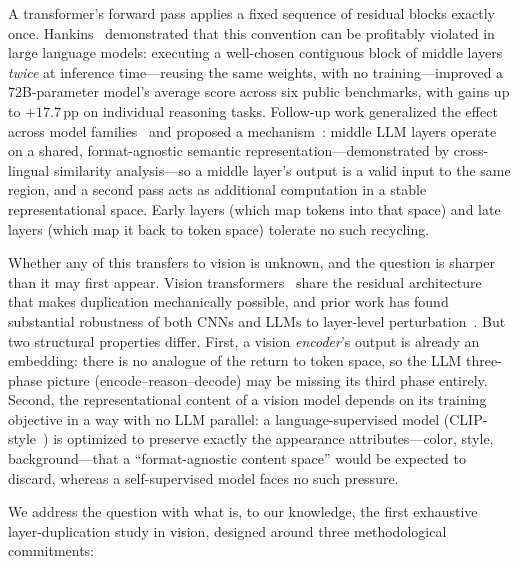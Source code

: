 \documentclass{article}
\newcommand{\pp}{\,\mathrm{pp}}
\begin{document}
A transformer's forward pass applies a fixed sequence of residual blocks
exactly once. Hankins~\citep{hankins2025rys} demonstrated that this
convention can be profitably violated in large language models: executing
a well-chosen contiguous block of middle layers \emph{twice} at inference
time---reusing the same weights, with no training---improved a 72B-parameter
model's average score across six public benchmarks, with gains up to
$+17.7\pp$ on individual reasoning tasks. Follow-up work generalized the
effect across model families~\citep{hankins2025rysii} and proposed a
mechanism~\citep{hankins2025sapirwhorf}: middle LLM layers operate on a
shared, format-agnostic semantic representation---demonstrated by
cross-lingual similarity analysis---so a middle layer's output is a valid
input to the same region, and a second pass acts as additional
computation in a stable representational space. Early layers (which map
tokens into that space) and late layers (which map it back to token
space) tolerate no such recycling.

Whether any of this transfers to vision is unknown, and the question is
sharper than it may first appear. Vision transformers~\citep{dosovitskiy2021image}
share the residual architecture that makes duplication mechanically
possible, and prior work has found substantial robustness of both CNNs
and LLMs to layer-level perturbation~\citep{huang2016deep,lad2024remarkable}.
But two structural properties differ. First, a vision \emph{encoder}'s
output is already an embedding: there is no analogue of the return to
token space, so the LLM three-phase picture (encode--reason--decode) may
be missing its third phase entirely. Second, the representational content
of a vision model depends on its training objective in a way with no LLM
parallel: a language-supervised model (CLIP-style~\citep{radford2021learning})
is optimized to preserve exactly the appearance attributes---color,
style, background---that a ``format-agnostic content space'' would be
expected to discard, whereas a self-supervised model faces no such
pressure.

We address the question with what is, to our knowledge, the first
exhaustive layer-duplication study in vision, designed around three
methodological commitments:
\end{document}
